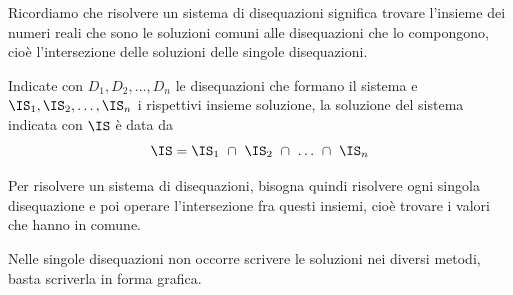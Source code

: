 Ricordiamo che risolvere un sistema di disequazioni significa trovare 
l'insieme dei numeri reali che sono le soluzioni comuni alle disequazioni 
che lo compongono, cioè l'intersezione delle soluzioni delle singole 
disequazioni. 

\begin{definizione}{}{}
Indicate con \(D_{1}, D_{2}, \ldots, D_n\) le disequazioni che formano 
il sistema e \(\IS_{1}, \IS_{2}, \ldots,\IS_n\) i rispettivi insieme 
soluzione, la soluzione del sistema indicata con \(\IS\) è data da 
\[\IS=\IS_1 ~\cap~ \IS_2 ~\cap~ \ldots ~\cap~ \IS_n\]
\end{definizione}

Per risolvere un sistema di disequazioni, bisogna quindi risolvere ogni 
singola disequazione e poi operare l'intersezione fra questi insiemi, cioè 
trovare i valori che hanno in comune.

\begin{osservazione}{}{}
Nelle singole disequazioni non occorre scrivere le soluzioni nei diversi 
metodi, basta scriverla in forma grafica.
\end{osservazione}


